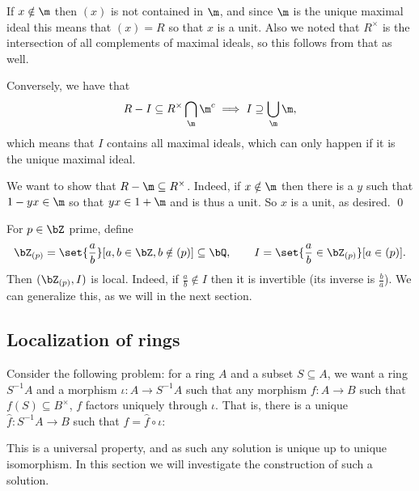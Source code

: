 \eprop

\bproof

    If $x\notin\m$ then $(x)$ is not contained in $\m$, and since $\m$ is the unique maximal ideal this means that $(x)=R$ so that $x$ is a unit.
    Also we noted that $R^\times$ is the intersection of all complements of maximal ideals, so this follows from that as well.

    Conversely, we have that
    $$ R-I \subseteq R^\times \bigcap_\m\m^c \implies I \supseteq \bigcup_\m\m , $$
    which means that $I$ contains all maximal ideals, which can only happen if it is the unique maximal ideal.

    We want to show that $R-\m\subseteq R^\times$.
    Indeed, if $x\notin\m$ then there is a $y$ such that $1-yx\in\m$ so that $yx\in1+\m$ and is thus a unit.
    So $x$ is a unit, as desired.
    \qed

\eproof

\bexam

    For $p\in\bZ$ prime, define
    $$ \bZ_{(p)} = \set{\frac ab}[a,b\in\bZ,b\notin(p)] \subseteq \bQ ,\qquad I = \set{\frac ab\in\bZ_{(p)}}[a\in(p)] . $$
    Then $(\bZ_{(p)},I)$ is local.
    Indeed, if $\frac ab\notin I$ then it is invertible (its inverse is $\frac ba$).
    We can generalize this, as we will in the next section.

\eexam

\subsection{Localization of rings}

Consider the following problem: for a ring $A$ and a subset $S\subseteq A$, we want a ring $S^{-1}A$ and a morphism $\iota\colon A\to S^{-1}A$
such that any morphism $f\colon A\to B$ such that $f(S)\subseteq B^\times$, $f$ factors uniquely through $\iota$.
That is, there is a unique $\hat f\colon S^{-1}A\to B$ such that $f=\hat f\circ\iota$:

\centerline{}

This is a universal property, and as such any solution is unique up to unique isomorphism.
In this section we will investigate the construction of such a solution.

\bdefn

